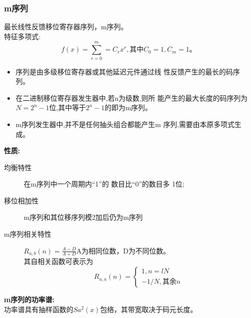 \subsubsection{m序列}
最长线性反馈移位寄存器序列，m序列。\\
特征多项式:
\begin{equation}\label{key}
f(x) =  \sum_{r = 0}^{m} = C_rx^r,\text{其中}C_0 = 1,C_m = 1。
\end{equation}
\begin{itemize}
	\item 序列是由多级移位寄存器或其他延迟元件通过线
	性反馈产生的最长的码序列。
	\item 在二进制移位寄存器发生器中,若n为级数,则所
	能产生的最大长度的码序列为$ N=2^n-1 $位,其中等于$ 2^n-1 $的即为m序列。
	\item m序列发生器中,并不是任何抽头组合都能产生m
	序列,需要由本原多项式生成。
\end{itemize}
\textbf{性质:}
\begin{description}
	\item[均衡特性] 在m序列中一个周期内“1”的
	数目比“0”的数目多 1位;
	\item[移位相加性] m序列和其位移序列模2加后仍为m序列
	\item[m序列相关特性] $ R_{a,b}(n) = \frac{A-D}{A+D} $A为相同位数，D为不同位数。\\其自相关函数可表示为
\[ 	 R_{a,a}(n)= \begin{cases}
		1,n=lN\\
		-1/N,其余n
	\end{cases} \]
\end{description}
\textbf{m序列的功率谱:}\\
功率谱具有抽样函数的$ Sa^2(x) $包络，其带宽取决于码元长度。

